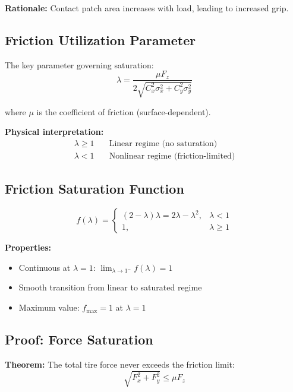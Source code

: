 \documentclass[11pt,a4paper]{article}
\begin{document}
\textbf{Rationale:} Contact patch area increases with load, leading to increased grip.

\subsection{Friction Utilization Parameter}

The key parameter governing saturation:
\begin{equation}
\lambda = \frac{\mu F_z}{2\sqrt{C_x^2 \sigma_x^2 + C_y^2 \sigma_y^2}}
\end{equation}

where $\mu$ is the coefficient of friction (surface-dependent).

\textbf{Physical interpretation:}
\begin{align}
\lambda \geq 1 &\quad \text{Linear regime (no saturation)} \\
\lambda < 1 &\quad \text{Nonlinear regime (friction-limited)}
\end{align}

\subsection{Friction Saturation Function}

\begin{equation}
f(\lambda) = \begin{cases}
(2 - \lambda)\lambda = 2\lambda - \lambda^2, & \lambda < 1 \\
1, & \lambda \geq 1
\end{cases}
\end{equation}

\textbf{Properties:}
\begin{itemize}
    \item Continuous at $\lambda = 1$: $\lim_{\lambda \to 1^-} f(\lambda) = 1$
    \item Smooth transition from linear to saturated regime
    \item Maximum value: $f_{\max} = 1$ at $\lambda = 1$
\end{itemize}

\subsection{Proof: Force Saturation}

\textbf{Theorem:} The total tire force never exceeds the friction limit:
\begin{equation}
\sqrt{F_x^2 + F_y^2} \leq \mu F_z
\end{equation}
\end{document}
